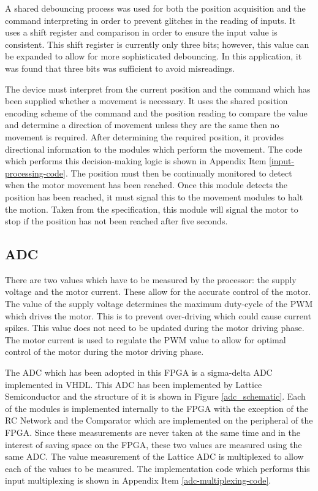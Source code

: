 A shared debouncing process was used for both the position acquisition and the command interpreting in order to prevent glitches in the reading of inputs. It uses a shift register and comparison in order to ensure the input value is consistent. This shift register is currently only three bits; however, this value can be expanded to allow for more sophisticated debouncing. In this application, it was found that three bits was sufficient to avoid misreadings.

The device must interpret from the current position and the command which has been supplied whether a movement is necessary. It uses the shared position encoding scheme of the command and the position reading to compare the value and determine a direction of movement unless they are the same then no movement is required. After determining the required position, it provides directional information to the modules which perform the movement. The code which performs this decision-making logic is shown in Appendix Item \ref{input-processing-code}. The position must then be continually monitored to detect when the motor movement has been reached. Once this module detects the position has been reached, it must signal this to the movement modules to halt the motion. Taken from the specification, this module will signal the motor to stop if the position has not been reached after five seconds. 

\subsection{ADC}

There are two values which have to be measured by the processor: the supply voltage and the motor current. These allow for the accurate control of the motor. The value of the supply voltage determines the maximum duty-cycle of the PWM which drives the motor. This is to prevent over-driving which could cause current spikes. This value does not need to be updated during the motor driving phase. The motor current is used to regulate the PWM value to allow for optimal control of the motor during the motor driving phase. 

The ADC which has been adopted in this FPGA is a sigma-delta ADC implemented in VHDL. This ADC has been implemented by Lattice Semiconductor and the structure of it is shown in Figure \ref{adc_schematic}. Each of the modules is implemented internally to the FPGA with the exception of the RC Network and the Comparator which are implemented on the peripheral of the FPGA. Since these measurements are never taken at the same time and in the interest of saving space on the FPGA, these two values are measured using the same ADC. The value measurement of the Lattice ADC is multiplexed to allow each of the values to be measured. The implementation code which performs this input multiplexing is shown in Appendix Item \ref{adc-multiplexing-code}.

